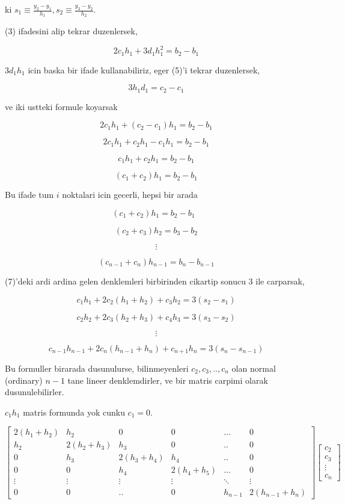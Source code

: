 \documentclass[12pt,fleqn]{article}\usepackage{common}
\begin{document}
ki $s_1 \equiv \frac{y_2 - y_1}{h_1}, s_2 \equiv \frac{y_3 - y_2}{h_2}$. 

(3) ifadesini alip tekrar duzenlersek, 

\[  2c_1h_1 + 3d_1h_1^2  = b_2 - b_1\]

$3d_1h_1$ icin baska bir ifade kullanabiliriz, eger (5)'i tekrar
duzenlersek,

\[ 3h_1d_1 = c_2 - c_1\]

ve iki ustteki formule koyarsak

\[  2c_1h_1 + (c_2 - c_1)h_1  = b_2 - b_1\]

\[  2c_1h_1 + c_2h_1 - c_1h_1  = b_2 - b_1\]

\[  c_1h_1 + c_2h_1  = b_2 - b_1\]

\[  (c_1 + c_2) h_1  = b_2 - b_1\]

Bu ifade tum $i$ noktalari icin gecerli, hepsi bir arada

\[  (c_1 + c_2) h_1  = b_2 - b_1 \ \ \ \label{6}\]

\[  (c_2 + c_3) h_2  = b_3 - b_2\]

\[ \vdots \]

\[  (c_{n-1} + c_n) h_{n-1}  = b_n - b_{n-1}\]

(7)'deki ardi ardina gelen denklemleri birbirinden cikartip sonucu 3 ile
carparsak, 

\[ c_1h_1 + 2c_2(h_1 + h_2) + c_3h_2 = 3(s_2 - s_1) \]

\[ c_2h_2 + 2c_3(h_2 + h_3) + c_4h_3 = 3(s_3 - s_2) \]

\[ \vdots \]

\[ c_{n-1}h_{n-1} + 2c_n(h_{n-1} + h_{n}) + c_{n+1}h_n = 3(s_n - s_{n-1}) \]

Bu formuller birarada dusunulurse, bilinmeyenleri $c_2,c_3,..,c_n$ olan
normal (ordinary) $n-1$ tane lineer denklemdirler, ve bir matris carpimi
olarak dusunulebilirler. 

$c_1h_1$ matris formunda yok cunku $c_1=0$. 

\[ 
\left[\begin{array}{cccccc}
2(h_1+h_2) & h_2 & 0 & 0 & ... & 0 \\
h_2 & 2(h_2+h_3) & h_3 & 0 & .. & 0  \\
0 & h_3 & 2(h_3+h_4) & h_4 & .. & 0 \\
0 & 0 & h_4 & 2(h_4+h_5) & ... & 0 \\
\vdots & \vdots & \vdots & \vdots & \ddots & \vdots  \\
0 & 0 & .. & 0 & h_{n-1} & 2(h_{n-1}+h_n) 
\end{array}\right]
\left[\begin{array}{r}
c_2 \\ c_3 \\ \vdots \\ c_n
\end{array}\right]
 \]
\end{document}
